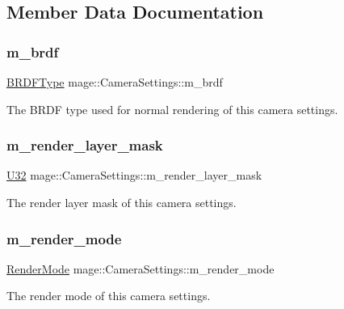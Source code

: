 \subsection{Member Data Documentation}
\hypertarget{classmage_1_1_camera_settings_ac6a51ea7c770af79de4f97b53cab83b7}{}\label{classmage_1_1_camera_settings_ac6a51ea7c770af79de4f97b53cab83b7} 
\subsubsection{\texorpdfstring{m\+\_\+brdf}{m\_brdf}}
{\footnotesize\ttfamily \hyperlink{namespacemage_ae7a7a03a7b34d7e2689689bb8295cd38}{B\+R\+D\+F\+Type} mage\+::\+Camera\+Settings\+::m\+\_\+brdf\hspace{0.3cm}{\ttfamily [private]}}

The B\+R\+DF type used for normal rendering of this camera settings. \hypertarget{classmage_1_1_camera_settings_ad27594c8dc755e0dd8ca55564a4dff8b}{}\label{classmage_1_1_camera_settings_ad27594c8dc755e0dd8ca55564a4dff8b} 
\subsubsection{\texorpdfstring{m\+\_\+render\+\_\+layer\+\_\+mask}{m\_render\_layer\_mask}}
{\footnotesize\ttfamily \hyperlink{namespacemage_a41c104c036fba3756a74e19f793eeaa1}{U32} mage\+::\+Camera\+Settings\+::m\+\_\+render\+\_\+layer\+\_\+mask\hspace{0.3cm}{\ttfamily [private]}}

The render layer mask of this camera settings. \hypertarget{classmage_1_1_camera_settings_aa4d5139b4e8668c58507ead30812c84b}{}\label{classmage_1_1_camera_settings_aa4d5139b4e8668c58507ead30812c84b} 
\subsubsection{\texorpdfstring{m\+\_\+render\+\_\+mode}{m\_render\_mode}}
{\footnotesize\ttfamily \hyperlink{namespacemage_a5e7e18b0154373ce8fc942fe3f6b27fd}{Render\+Mode} mage\+::\+Camera\+Settings\+::m\+\_\+render\+\_\+mode\hspace{0.3cm}{\ttfamily [private]}}

The render mode of this camera settings. 